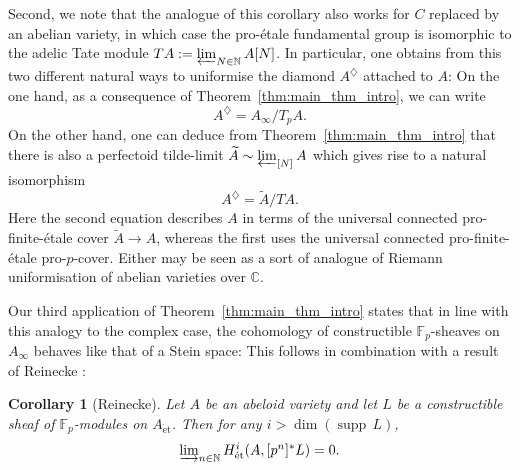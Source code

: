 \documentclass[10pt,oneside]{amsart}
\newtheorem{corollary}[theorem]{Corollary}
\theoremstyle{definition}
\newtheorem{question}[theorem]{Question}
\newtheorem{example}[theorem]{Example}
\newcommand{\supp}{{\operatorname{supp}\,}}
\newcommand{\et}{\operatorname{\acute{e}t}}
\newcommand{\N}{\mathbb{N}}
\newcommand{\C}{\mathbb{C}}
\newcommand{\F}{\mathbb{F}}
\begin{document}
Second, we note that the analogue of this corollary also works for $C$ replaced by an abelian variety, in which case the pro-\'etale fundamental group is isomorphic to the adelic Tate module $TA:=\varprojlim_{N\in \N}A[N]$. In particular, one obtains from this two different natural ways to uniformise the diamond $A^{\diamondsuit}$ attached to $A$: On the one hand, as a consequence of Theorem~\ref{thm:main_thm_intro}, we can write
\[ A^{\diamondsuit}=A_\infty/T_pA.\]
On the other hand, one can deduce from Theorem~\ref{thm:main_thm_intro} that there is also a perfectoid tilde-limit $\widetilde{A}\sim \varprojlim_{[N]} A$ which gives rise to a natural isomorphism
\[ A^{\diamondsuit}=\widetilde{A}/T A.\]
Here the second equation describes $A$ in terms of the universal connected pro-finite-\'etale cover $\widetilde{A}\to A$, whereas the first uses the universal connected pro-finite-\'etale pro-$p$-cover.
Either may be seen as a sort of analogue of Riemann uniformisation of abelian varieties over $\C$. 

Our third application of Theorem~\ref{thm:main_thm_intro} states that in line with this analogy to the complex case, the cohomology of constructible $\F_p$-sheaves on $A_\infty$ behaves like that of a Stein space: This follows in combination with a result of Reinecke \cite[Theorem 3.3]{Reinecke}:
\begin{corollary}[Reinecke]
	Let $A$ be an abeloid variety and let $L$ be a constructible sheaf of $\mathbb F_p$-modules on $A_{\et}$. Then for any $i>\dim(\supp L)$,
	\[\textstyle\varinjlim_{n\in \mathbb N}H_{\et}^i(A,[p^n]^{\ast}L)=0.\]
\end{corollary}

 \begin{comment}
Now we end the introduction by describing the content of each section. 

	\begin{question} \label{question_intro}
	    \begin{enumerate} 
	    \item		Given a rigid group $G$, when is there an adic space $G_\infty$ such that $G_\infty \sim  \varprojlim_{[p]} G ?$
	    \item If it exists, and $K$ is perfectoid, when is $G_\infty$ perfectoid?
	    \end{enumerate}
	\end{question}
 
 
	But before we give proofs for examples of rigid groups $G$ for which a perfectoid tilde-limit exists, we first note that the second question certainly doesn't have an affirmative answer for all rigid group varieties:
	\begin{example}
		For the additive group $\mathbb G_a^{\operatorname{an}}$, we know that $[p]$ is an isomorphism and therefore $\varprojlim_{[p]} \mathbb G_a=\mathbb G_a$ exists (even as an actual limit in the category of adic spaces) but is certainly not perfectoid.
	\end{example}

\end{comment} 
 
\end{document}

